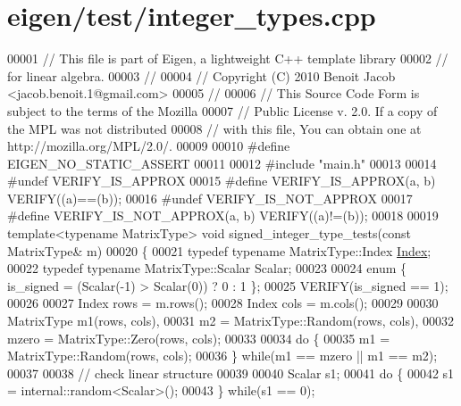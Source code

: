\hypertarget{eigen_2test_2integer__types_8cpp_source}{}\section{eigen/test/integer\+\_\+types.cpp}
\label{eigen_2test_2integer__types_8cpp_source}

\begin{DoxyCode}
00001 \textcolor{comment}{// This file is part of Eigen, a lightweight C++ template library}
00002 \textcolor{comment}{// for linear algebra.}
00003 \textcolor{comment}{//}
00004 \textcolor{comment}{// Copyright (C) 2010 Benoit Jacob <jacob.benoit.1@gmail.com>}
00005 \textcolor{comment}{//}
00006 \textcolor{comment}{// This Source Code Form is subject to the terms of the Mozilla}
00007 \textcolor{comment}{// Public License v. 2.0. If a copy of the MPL was not distributed}
00008 \textcolor{comment}{// with this file, You can obtain one at http://mozilla.org/MPL/2.0/.}
00009 
00010 \textcolor{preprocessor}{#define EIGEN\_NO\_STATIC\_ASSERT}
00011 
00012 \textcolor{preprocessor}{#include "main.h"}
00013 
00014 \textcolor{preprocessor}{#undef VERIFY\_IS\_APPROX}
00015 \textcolor{preprocessor}{#define VERIFY\_IS\_APPROX(a, b) VERIFY((a)==(b));}
00016 \textcolor{preprocessor}{#undef VERIFY\_IS\_NOT\_APPROX}
00017 \textcolor{preprocessor}{#define VERIFY\_IS\_NOT\_APPROX(a, b) VERIFY((a)!=(b));}
00018 
00019 \textcolor{keyword}{template}<\textcolor{keyword}{typename} MatrixType> \textcolor{keywordtype}{void} signed\_integer\_type\_tests(\textcolor{keyword}{const} MatrixType& m)
00020 \{
00021   \textcolor{keyword}{typedef} \textcolor{keyword}{typename} MatrixType::Index \hyperlink{namespace_eigen_a62e77e0933482dafde8fe197d9a2cfde}{Index};
00022   \textcolor{keyword}{typedef} \textcolor{keyword}{typename} MatrixType::Scalar Scalar;
00023 
00024   \textcolor{keyword}{enum} \{ is\_signed = (Scalar(-1) > Scalar(0)) ? 0 : 1 \};
00025   VERIFY(is\_signed == 1);
00026 
00027   Index rows = m.rows();
00028   Index cols = m.cols();
00029 
00030   MatrixType m1(rows, cols),
00031              m2 = MatrixType::Random(rows, cols),
00032              mzero = MatrixType::Zero(rows, cols);
00033 
00034   \textcolor{keywordflow}{do} \{
00035     m1 = MatrixType::Random(rows, cols);
00036   \} \textcolor{keywordflow}{while}(m1 == mzero || m1 == m2);
00037 
00038   \textcolor{comment}{// check linear structure}
00039 
00040   Scalar s1;
00041   \textcolor{keywordflow}{do} \{
00042     s1 = internal::random<Scalar>();
00043   \} \textcolor{keywordflow}{while}(s1 == 0);

\end{DoxyCode}
